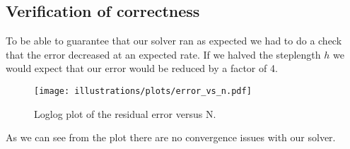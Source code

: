 
\subsection{Verification of correctness} %
\label{sub:verification_of_correctness}
To be able to guarantee that our solver ran as expected we had to do a check that the error decreased at an expected rate. If we halved the steplength $h$ we would expect that our error would be reduced by a factor of 4. 

\begin{figure}[htbp]
	\centering
	\texttt{[image: illustrations/plots/error\_vs\_n.pdf]}
	\caption{Loglog plot of the residual error versus N.}
	\label{fig:label}
\end{figure}

As we can see from the plot there are no convergence issues with our solver. 


